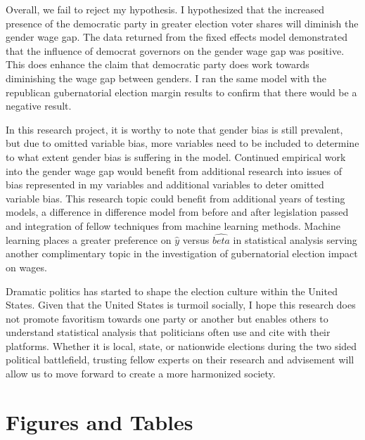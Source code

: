 \documentclass[12pt, English]{article}
\begin{document}
Overall, we fail to reject my hypothesis. I hypothesized that the increased presence of the democratic party in greater election voter shares will diminish the gender wage gap. The data returned from the fixed effects model demonstrated that the influence of democrat governors on the gender wage gap was positive. This does enhance the claim that democratic party does work towards diminishing the wage gap between genders. I ran the same model with the republican gubernatorial election margin results to confirm that there would be a negative result. 

In this research project, it is worthy to note that gender bias is still prevalent, but due to omitted variable bias, more variables need to be included to determine to what extent gender bias is suffering in the model.  Continued empirical work into the gender wage gap would benefit from additional research into issues of bias represented in my variables and additional variables to deter omitted variable bias. This research topic could benefit from additional years of testing models, a difference in difference model from before and after legislation passed and integration of fellow techniques from machine learning methods. Machine learning places a greater preference on \begin{math} \hat{y} \end{math} versus \begin{math} \hat{beta} \end{math} in statistical analysis serving another complimentary topic in the investigation of gubernatorial election impact on wages.

Dramatic politics has started to shape the election culture within the United States. Given that the United States is turmoil socially, I hope this research does not promote favoritism towards one party or another but enables others to understand statistical analysis that politicians often use and cite with their platforms. Whether it is local, state, or nationwide elections during the two sided political battlefield, trusting fellow experts on their research and advisement will allow us to move forward to create a more harmonized society. 
\newpage







\newpage
\section*{Figures and Tables}
\end{document}
